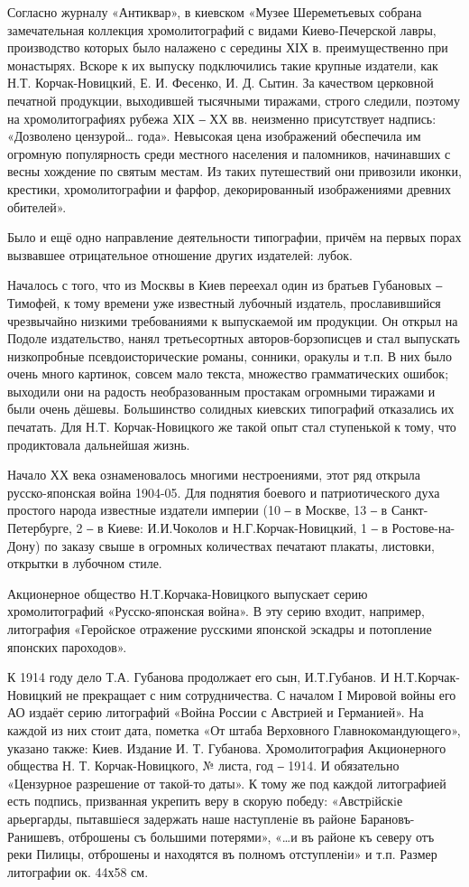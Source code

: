 Согласно журналу «Антиквар», в киевском «Музее Шереметьевых собрана
замечательная коллекция хромолитографий с видами Киево-Печерской лавры,
производство которых было налажено с середины ХІХ в. преимущественно при
монастырях. Вскоре к их выпуску подключились такие крупные издатели, как Н.Т.
Корчак-Новицкий, Е. И. Фесенко, И. Д. Сытин. За качеством церковной печатной
продукции, выходившей тысячными тиражами, строго следили, поэтому на
хромолитографиях рубежа ХІХ ‒ ХХ вв. неизменно присутствует надпись: «Дозволено
цензурой… года». Невысокая цена изображений обеспечила им огромную популярность
среди местного населения и паломников, начинавших с весны хождение по святым
местам. Из таких путешествий они привозили иконки, крестики, хромолитографии и
фарфор, декорированный изображениями древних обителей». 

Было и ещё одно направление деятельности типографии, причём на первых порах
вызвавшее отрицательное отношение других издателей: лубок. 

Началось с того, что из Москвы в Киев переехал один из братьев Губановых ‒
Тимофей, к тому времени уже известный лубочный издатель, прославившийся
чрезвычайно низкими требованиями к выпускаемой им продукции. Он открыл на
Подоле издательство, нанял третьесортных авторов-борзописцев и стал выпускать
низкопробные псевдоисторические романы, сонники, оракулы и т.п. В них было
очень много картинок, совсем мало текста, множество грамматических ошибок;
выходили они на радость необразованным простакам огромными тиражами и были
очень дёшевы. Большинство солидных киевских типографий отказались их печатать.
Для Н.Т. Корчак-Новицкого же такой опыт стал ступенькой к тому, что
продиктовала дальнейшая жизнь.

Начало ХХ века ознаменовалось многими нестроениями, этот ряд открыла
русско-японская война 1904-05. Для поднятия боевого и патриотического духа
простого народа известные издатели империи (10 ‒ в Москве, 13 ‒ в
Санкт-Петербурге, 2 ‒ в Киеве: И.И.Чоколов и Н.Г.Корчак-Новицкий, 1 ‒ в
Ростове-на-Дону) по заказу свыше в огромных количествах печатают плакаты,
листовки, открытки в лубочном стиле. 

Акционерное общество Н.Т.Корчака-Новицкого выпускает серию хромолитографий
«Русско-японская война». В эту серию входит, например, литография «Геройское
отражение русскими японской эскадры и потопление японских пароходов».

К 1914 году дело Т.А. Губанова продолжает его сын, И.Т.Губанов. И
Н.Т.Корчак-Новицкий не прекращает с ним сотрудничества. С началом I Мировой
войны его АО издаёт серию литографий «Война России с Австрией и Германией». На
каждой из них стоит дата, пометка «От штаба Верховного Главнокомандующего»,
указано также: Киев. Издание И. Т. Губанова. Хромолитография Акционерного
общества Н. Т. Корчак-Новицкого, № листа, год ‒ 1914. И обязательно «Цензурное
разрешение от такой-то даты». К тому же под каждой литографией есть подпись,
призванная укрепить веру в скорую победу: «Австрiйскiе арьергарды, пытавшiеся
задержать наше наступленiе въ районе Барановъ-Ранишевъ, отброшены съ большими
потерями», «…и въ районе къ северу отъ реки Пилицы, отброшены и находятся въ
полномъ отступленiи» и т.п. Размер литографии ок. 44х58 см.

